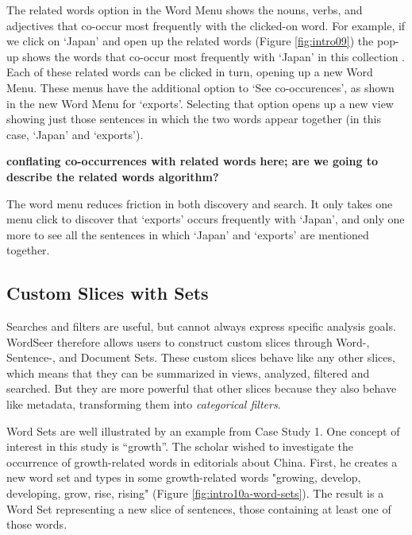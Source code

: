 \documentclass{sig-alternate}
\newcommand{\strong}[1] {\textbf{#1}}
\begin{document}
\begin{enumerate}
The related words option in the Word Menu shows the nouns, verbs, and adjectives that co-occur most frequently with the clicked-on word. For example, if we click on `Japan' and open up the related words (Figure \ref{fig:intro09}) the pop-up shows the words that co-occur most frequently with `Japan' in this collection \cite{algorithm used}. Each of these related words can be clicked in turn, opening up a new Word Menu. These menus have the additional option to `See co-occurences', as shown in the new Word Menu for `exports'.  Selecting that option opens up a new view showing just those sentences in which the two words appear together  (in this case, `Japan' and `exports').  

\strong{conflating co-occurrences with related words here; are we going to describe the related words algorithm?}

The word menu reduces friction in both discovery and search. It only takes one menu click to discover that `exports' occurs frequently with `Japan', and only one more to see all the sentences in which `Japan' and `exports' are mentioned together.  


\subsection{Custom Slices with Sets}

Searches and filters are useful, but cannot always express  specific analysis goals. WordSeer therefore allows users to construct custom slices through Word-, Sentence-, and Document Sets. These custom slices behave like any other slices, which means that they can be summarized in views,  analyzed, filtered and searched. But they are more powerful that other slices because they also behave like metadata, transforming them into \emph{categorical filters}.

Word Sets are well illustrated by an example from Case Study 1.  One concept of interest in this study is ``growth''. The scholar wished to investigate the occurrence of growth-related words in editorials about China.  First, he creates a new word set and types in some growth-related words "growing, develop, developing, grow, rise, rising" (Figure \ref{fig:intro10a-word-sets}). The result is a Word Set representing a new slice of sentences, those containing at least one of those words. 


\end{enumerate}
\end{document}
